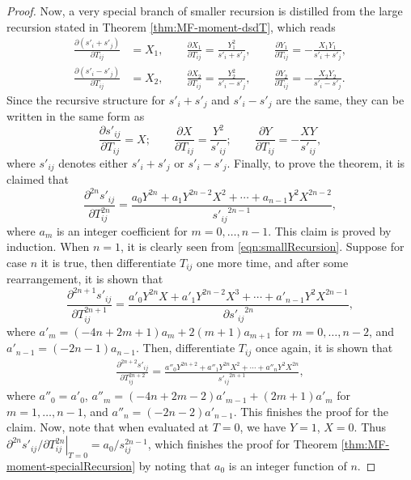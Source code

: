\begin{proof}
	Now, a very special branch of smaller recursion is distilled from the large recursion stated in Theorem \ref{thm:MF-moment-dsdT}, which reads
	\begin{align} \label{eqn:smallRecursion}
		\frac{\partial (s'_i+s'_j)}{\partial T_{ij}} &= X_1, \qquad \frac{\partial X_1}{\partial T_{ij}} = \frac{Y_1^2}{s'_i+s'_j}, \qquad \frac{\partial Y_1}{\partial T_{ij}} = -\frac{X_1Y_1}{s'_i+s'_j}, \nonumber \\
		\frac{\partial (s'_i-s'_j)}{\partial T_{ij}} &= X_2, \qquad \frac{\partial X_2}{\partial T_{ij}} = \frac{Y_2^2}{s'_i-s'_j}, \qquad \frac{\partial Y_2}{\partial T_{ij}} = -\frac{X_2Y_2}{s'_i-s'_j}.
	\end{align}
	Since the recursive structure for $s'_i+s'_j$ and $s'_i-s'_j$ are the same, they can be written in the same form as
	\begin{equation*}
		\frac{\partial s'_{ij}}{\partial T_{ij}} = X; \qquad \frac{\partial X}{\partial T_{ij}} = \frac{Y^2}{s'_{ij}}; \qquad \frac{\partial Y}{\partial T_{ij}} = -\frac{XY}{s'_{ij}},
	\end{equation*}
	where $s'_{ij}$ denotes either $s'_i+s'_j$ or $s'_i-s'_j$.
	Finally, to prove the theorem, it is claimed that
	\begin{equation*}
		\frac{\partial^{2n} s'_{ij}}{\partial T_{ij}^{2n}} = \frac{a_0Y^{2n} + a_1Y^{2n-2}X^2 + \cdots + a_{n-1}Y^2X^{2n-2}}{{s'_{ij}}^{2n-1}},
	\end{equation*}
	where $a_m$ is an integer coefficient for $m=0,\ldots,n-1$.
	This claim is proved by induction.
	When $n=1$, it is clearly seen from \eqref{eqn:smallRecursion}.
	Suppose for case $n$ it is true, then differentiate $T_{ij}$ one more time, and after some rearrangement, it is shown that
	\begin{equation*}
		\frac{\partial^{2n+1} s'_{ij}}{\partial T_{ij}^{2n+1}} = \frac{a'_0Y^{2n}X + a'_1Y^{2n-2}X^3 + \cdots + a'_{n-1}Y^2X^{2n-1}}{\partial {s'_{ij}}^{2n}},
	\end{equation*}
	where $a'_m = (-4n+2m+1)a_m + 2(m+1)a_{m+1}$ for $m=0,\ldots,n-2$, and $a'_{n-1} = (-2n-1)a_{n-1}$.
	Then, differentiate $T_{ij}$ once again, it is shown that
	\begin{align*}
		\frac{\partial^{2n+2} s'_{ij}}{\partial T_{ij}^{2n+2}} = \frac{a''_0Y^{2n+2} + a''_1Y^{2n}X^2 + \cdots + a''_{n}Y^2X^{2n}}{{s'_{ij}}^{2n+1}},
	\end{align*}
	where $a''_0 = a'_0$, $a''_m = (-4n+2m-2)a'_{m-1} + (2m+1)a'_m$ for $m=1,\ldots,n-1$, and $a''_n = (-2n-2)a'_{n-1}$.
	This finishes the proof for the claim.
	Now, note that when evaluated at $T=0$, we have $Y=1$, $X=0$.
	Thus $\left. \partial^{2n}s'_{ij} / \partial T_{ij}^{2n} \right|_{T=0} = a_0 / s_{ij}^{2n-1}$, which finishes the proof for Theorem \ref{thm:MF-moment-specialRecursion} by noting that $a_0$ is an integer function of $n$.
\end{proof}

